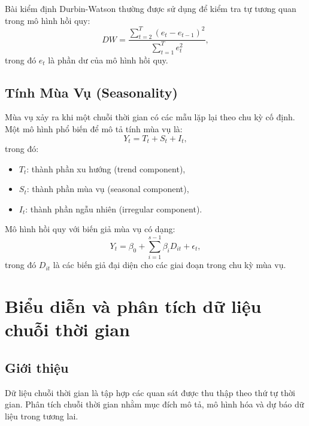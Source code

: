 Bài kiểm định Durbin-Watson thường được sử dụng để kiểm tra tự tương quan trong mô hình hồi quy:
\begin{equation}
    DW = \frac{\sum_{t=2}^{T} (e_t - e_{t-1})^2}{\sum_{t=1}^{T} e_t^2},
\end{equation}
trong đó $e_t$ là phần dư của mô hình hồi quy.

\subsection{Tính Mùa Vụ (Seasonality)}
Mùa vụ xảy ra khi một chuỗi thời gian có các mẫu lặp lại theo chu kỳ cố định. Một mô hình phổ biến để mô tả tính mùa vụ là:
\begin{equation}
    Y_t = T_t + S_t + I_t,
\end{equation}
trong đó:
\begin{itemize}
    \item $T_t$: thành phần xu hướng (trend component),
    \item $S_t$: thành phần mùa vụ (seasonal component),
    \item $I_t$: thành phần ngẫu nhiên (irregular component).
\end{itemize}
Mô hình hồi quy với biến giả mùa vụ có dạng:
\begin{equation}
    Y_t = \beta_0 + \sum_{i=1}^{s-1} \beta_i D_{it} + \epsilon_t,
\end{equation}
trong đó $D_{it}$ là các biến giả đại diện cho các giai đoạn trong chu kỳ mùa vụ.


\section{Biểu diễn và phân tích dữ liệu chuỗi thời gian}
\subsection{Giới thiệu}
Dữ liệu chuỗi thời gian là tập hợp các quan sát được thu thập theo thứ tự thời gian. Phân tích chuỗi thời gian nhằm mục đích mô tả, mô hình hóa và dự báo dữ liệu trong tương lai.

